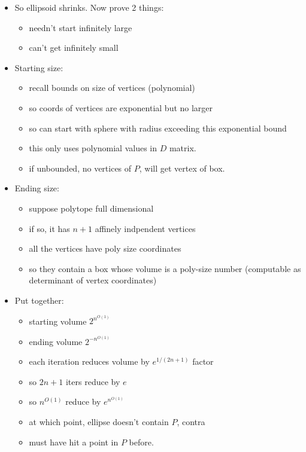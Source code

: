 \documentclass{article}
\begin{document}
\begin{itemize}
\item So ellipsoid shrinks.  Now prove 2 things:
\begin{itemize}
	\item needn't start infinitely large
	\item can't get infinitely small
\end{itemize}

\item Starting size: 
\begin{itemize}
	\item recall bounds on size of vertices (polynomial)
	\item so coords of vertices are exponential but no larger
	\item so can start with sphere with radius exceeding this exponential
	bound
	\item this only uses polynomial values in $D$ matrix.
	\item if unbounded, no vertices of $P$, will get vertex of box.
\end{itemize}

\item Ending size:
\begin{itemize}
	\item suppose polytope full dimensional
	\item if so, it has $n+1$ affinely indpendent vertices
	\item all the vertices have poly size coordinates
	\item so they contain a box whose volume is a poly-size number
	(computable as determinant of vertex coordinates)
\end{itemize}

\item Put together:
\begin{itemize}
	\item starting volume $2^{n^{O(1)}}$
	\item ending volume $2^{-n^{O(1)}}$
	\item each iteration reduces volume by $e^{1/(2n+1)}$ factor
	\item so $2n+1$ iters reduce by $e$
	\item so $n^{O(1)}$ reduce by $e^{n^{O(1)}}$
	\item at which point, ellipse doesn't contain $P$, contra
	\item must have hit a point in $P$ before.
\end{itemize}


\end{itemize}
\end{document}
